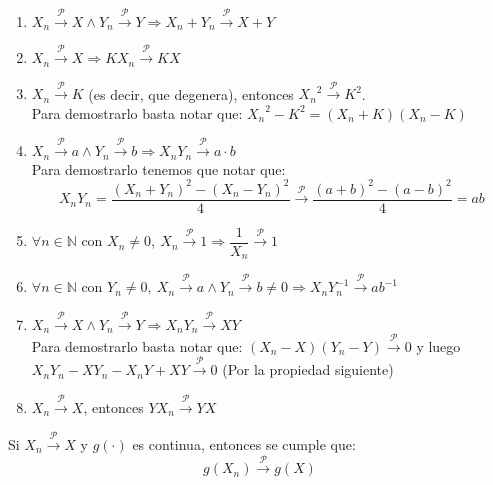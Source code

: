 \documentclass[12pt,a4paper]{book}
\begin{document}
\begin{enumerate}
\item $ X_n \stackrel{\mathcal{P}}{\longrightarrow} X \wedge Y_n \stackrel{\mathcal{P}}{\longrightarrow} Y \Longrightarrow X_n + Y_n \stackrel{\mathcal{P}}{\longrightarrow} X + Y$
\item $X_n \stackrel{\mathcal{P}}{\longrightarrow} X \Longrightarrow KX_n \stackrel{\mathcal{P}}{\longrightarrow} KX$
\item $X_n \stackrel{\mathcal{P}}{\longrightarrow} K$ (es decir, que degenera), entonces ${X_n}^2 \stackrel{\mathcal{P}}{\longrightarrow} K^2$.\\
Para demostrarlo basta notar que: $ {X_n}^2 - K^2 = (X_n + K) (X_n -K)$
\item $X_n \stackrel{\mathcal{P}}{\longrightarrow} a \wedge Y _n \stackrel{\mathcal{P}}{\longrightarrow} b \Longrightarrow X_nY_n \stackrel{\mathcal{P}}{\longrightarrow} a \cdot b$\\

Para demostrarlo tenemos que notar que:
$$X_n Y_n = \dfrac{(X_n + Y_n)^2-(X_n - Y_n)^2}{4}\stackrel{\mathcal{P}}{\longrightarrow} \dfrac{(a+b)^2-(a-b)^2}{4}=ab$$

\item $\forall n\in\mathbb{N}$ con $X_n\not = 0, \ X_n \stackrel{\mathcal{P}}{\longrightarrow} 1 \Longrightarrow \dfrac{1}{X_n} \stackrel{\mathcal{P}}{\longrightarrow} 1$
\item $\forall n\in\mathbb{N}$ con $Y_n\not = 0, \ X_n \stackrel{\mathcal{P}}{\longrightarrow} a \wedge Y_n \stackrel{\mathcal{P}}{\longrightarrow} b\not =0 \Longrightarrow X_nY_n^{-1}\stackrel{\mathcal{P}}{\longrightarrow} ab^{-1}$
\item $X_n \stackrel{\mathcal{P}}{\longrightarrow} X \wedge Y_n\stackrel{\mathcal{P}}{\longrightarrow} Y \Longrightarrow X_nY_n\stackrel{\mathcal{P}}{\longrightarrow} XY$\\

Para demostrarlo basta notar que: $(X_n - X)(Y_n - Y)\stackrel{\mathcal{P}}{\longrightarrow} 0$ y luego $X_nY_n-XY_n-X_nY+XY\stackrel{\mathcal{P}}{\longrightarrow} 0$ (Por la propiedad siguiente)
\item $X_n\stackrel{\mathcal{P}}{\longrightarrow} X$, entonces $YX_n\stackrel{\mathcal{P}}{\longrightarrow} YX$
\end{enumerate}

\begin{theorem}
Si $X_n\stackrel{\mathcal{P}}{\longrightarrow} X$ y $g(\cdot)$ es continua, entonces se cumple que:
$$g(X_n)\stackrel{\mathcal{P}}{\longrightarrow} g(X)$$
\end{theorem}
\end{document}

